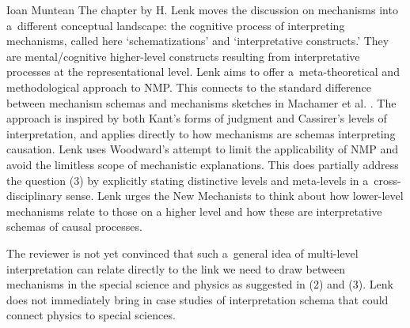 \begin{recengenv}{Ioan Muntean}
The chapter by H. Lenk moves the discussion on mechanisms into a~different conceptual landscape: the cognitive process of interpreting mechanisms, called here ‘schematizations' and ‘interpretative constructs.' They are mental/cognitive higher-level constructs resulting from interpretative processes at the representational level. Lenk aims to offer a~meta-theoretical and methodological approach to NMP. This connects to the standard difference between mechanism schemas and mechanisms sketches in Machamer et al.
\parencite*[][]{machamer_thinking_2000}. %
 The approach is inspired by both Kant's forms of judgment and Cassirer's levels of interpretation, and applies directly to how mechanisms are schemas interpreting causation. Lenk uses Woodward's 
\parencite*[][]{woodward_mechanistic_2013} %
 attempt to limit the applicability of NMP and avoid the limitless scope of mechanistic explanations. This does partially address the question (3) by explicitly stating distinctive levels and meta-levels in a~cross-disciplinary sense. Lenk urges the New Mechanists to think about how lower-level mechanisms relate to those on a higher level and how these are interpretative schemas of causal processes.

The reviewer is not yet convinced that such a~general idea of multi-level interpretation can relate directly to the link we need to draw between mechanisms in the special science and physics as suggested in (2) and (3). Lenk does not immediately bring in case studies of interpretation schema that could connect physics to special sciences.


\end{recengenv}
